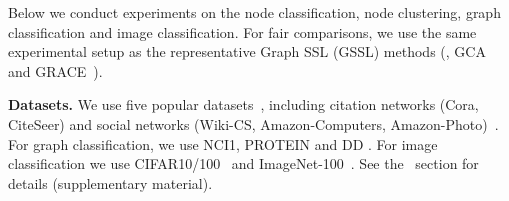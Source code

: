 






Below we conduct  experiments on %
the node classification, node clustering, graph classification and image classification. 
For fair comparisons, we use the same experimental setup as the representative Graph SSL (GSSL) methods (\ie, GCA~\cite{zhu2020deep} and GRACE~\cite{zhu2021graph}). %

\vspace{0.1cm}
\noindent\textbf{Datasets.}
We use five popular %
datasets~\cite{zhu2020deep, zhu2021graph,velickovic2019deep}, including citation networks (Cora, CiteSeer) and social networks (Wiki-CS, Amazon-Computers, Amazon-Photo)~\cite{kipf2016semi,sinha2015overview,mcauley2015image, mernyei2020wiki}. 
For graph classification, we use NCI1, PROTEIN and DD \cite{dobson2003distinguishing,riesen2008iam}. For image classification we use CIFAR10/100~\cite{krizhevsky2009learning} and ImageNet-100~\cite{DBLP:conf/cvpr/DengDSLL009}.
See the ~section for details (supplementary material).

